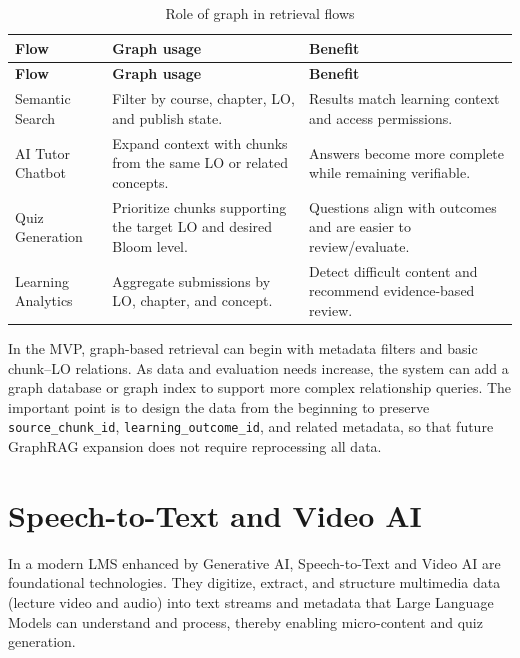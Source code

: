 \begin{longtable}{|p{3.2cm}|p{4.5cm}|p{6.3cm}|}
\caption{Role of graph in retrieval flows}
\label{tab:graph-based-retrieval-roles}\\
\hline
\textbf{Flow} & \textbf{Graph usage} & \textbf{Benefit} \\
\hline
\endfirsthead
\hline
\textbf{Flow} & \textbf{Graph usage} & \textbf{Benefit} \\
\hline
\endhead
Semantic Search & Filter by course, chapter, LO, and publish state. & Results match learning context and access permissions. \\
\hline
AI Tutor Chatbot & Expand context with chunks from the same LO or related concepts. & Answers become more complete while remaining verifiable. \\
\hline
Quiz Generation & Prioritize chunks supporting the target LO and desired Bloom level. & Questions align with outcomes and are easier to review/evaluate. \\
\hline
Learning Analytics & Aggregate submissions by LO, chapter, and concept. & Detect difficult content and recommend evidence-based review. \\
\hline
\end{longtable}

In the MVP, graph-based retrieval can begin with metadata filters and
basic chunk--LO relations. As data and evaluation needs increase, the
system can add a graph database or graph index to support more complex
relationship queries. The important point is to design the data from the
beginning to preserve \texttt{source\_chunk\_id},
\texttt{learning\_outcome\_id}, and related metadata, so that future
GraphRAG expansion does not require reprocessing all data.

\section{Speech-to-Text and Video AI}
In a modern LMS enhanced by Generative AI, Speech-to-Text and Video AI
are foundational technologies. They digitize, extract, and structure
multimedia data (lecture video and audio) into text streams and metadata
that Large Language Models can understand and process, thereby enabling
micro-content and quiz generation.

